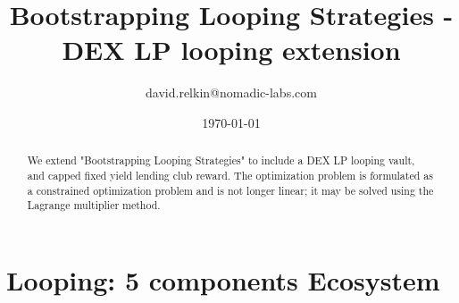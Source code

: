 \documentclass{article}
\begin{document}
\setlength{\parindent}{0pt}

\title{Bootstrapping Looping Strategies - DEX LP looping extension}
\author{david.relkin@nomadic-labs.com}
\date{\today}
\maketitle

\begin{abstract}
    We extend "Bootstrapping Looping Strategies" to include a DEX LP looping vault, and capped fixed yield lending club reward.
    The optimization problem is formulated as a constrained optimization problem and is not longer linear; 
    it may be solved using the Lagrange multiplier method.
\end{abstract}

\section{Looping: 5 components Ecosystem}
\end{document}
